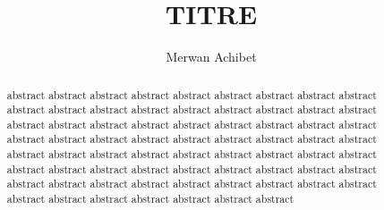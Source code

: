 \documentclass[10pt]{article}
\title{TITRE}
\author{Merwan Achibet}
\date{}
\begin{document}
\maketitle

\begin{abstract}
abstract abstract abstract abstract abstract abstract abstract
abstract abstract abstract abstract abstract abstract abstract
abstract abstract abstract abstract abstract abstract abstract
abstract abstract abstract abstract abstract abstract abstract
abstract abstract abstract abstract abstract abstract abstract
abstract abstract abstract abstract abstract abstract abstract
abstract abstract abstract abstract abstract abstract abstract
abstract abstract abstract abstract abstract abstract abstract
abstract abstract abstract abstract abstract abstract abstract
abstract abstract abstract abstract abstract abstract abstract
\end{abstract}
\end{document}
